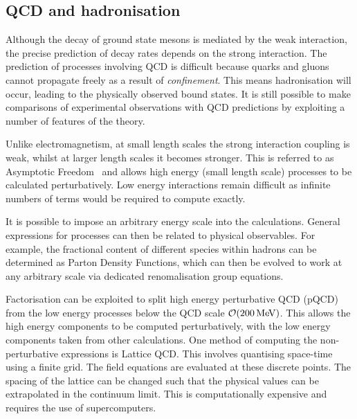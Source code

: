 \subsection{QCD and hadronisation}
\label{sec:theory_QCD}
Although the decay of ground state \Bp mesons is mediated by the weak interaction, the precise prediction of decay rates depends on the strong interaction.  
The prediction of processes involving QCD is difficult because quarks and gluons cannot propagate freely as a result of \emph{confinement}. This means hadronisation will occur, leading to the physically observed bound states. It is still possible to make comparisons of experimental observations with QCD predictions by exploiting a number of features of the theory. 

Unlike electromagnetism, at small length scales the strong interaction coupling is weak, whilst at larger length scales it becomes stronger. This is referred to as Asymptotic Freedom~\cite{PhysRevLett.30.1343,PhysRevLett.30.1346} and allows high energy (small length scale) processes to be calculated perturbatively. Low energy interactions remain difficult as infinite numbers of terms would be required to compute exactly.  

It is possible to impose an arbitrary energy scale into the calculations. General expressions for processes can then be related to physical observables. 
For example, the fractional content of different species within hadrons can be determined as Parton Density Functions, which can then be evolved to work at any arbitrary scale via dedicated renomalisation group equations. 

Factorisation can be exploited to split high energy perturbative QCD (pQCD) from the low energy processes below the QCD scale $\mathcal{O}(200\mathrm{\,Me\kern -0.1em V})$. This allows the high energy components to be computed perturbatively, with the low energy components taken from other calculations. One method of computing the non-perturbative expressions is Lattice QCD. This involves quantising space-time using a finite grid. The field equations are evaluated at these discrete points. The spacing of the lattice can be changed such that the physical values can be extrapolated in the continuum limit. This is computationally expensive and requires the use of supercomputers. 


